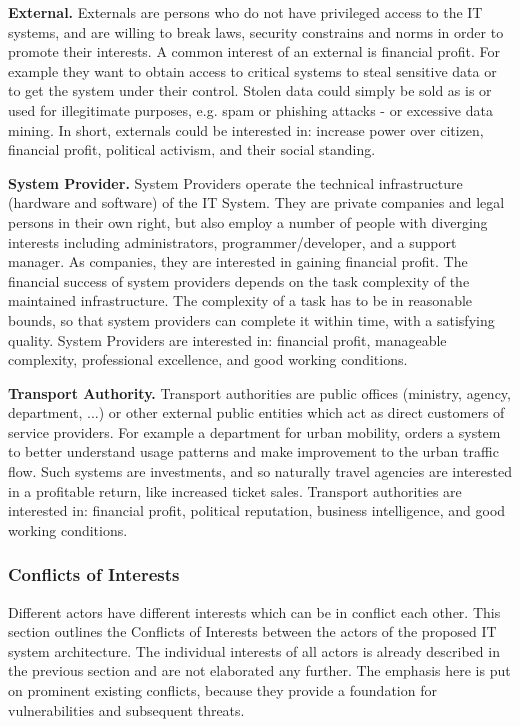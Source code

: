 \documentclass[runningheads,a4paper]{llncs}
\begin{document}
\textbf{External.}
Externals are persons who do not have privileged access to the IT systems, and are willing to break laws, security constrains and norms in order to promote their interests. A common interest of an external is financial profit. For example they want to obtain access to critical systems to steal sensitive data or to get the system under their control. Stolen data could simply be sold as is or used for illegitimate purposes, e.g. spam or phishing attacks - or excessive data mining. In short, externals could be interested in: increase power over citizen, financial profit, political activism, and their social standing.

\textbf{System Provider.}
System Providers operate the technical infrastructure (hardware and software) of the IT System. They are private companies and legal persons in their own right, but also employ a number of people with diverging interests including administrators, programmer/developer, and a support manager. As companies, they are interested in gaining financial profit. The financial success of system providers depends on the task complexity of the maintained infrastructure. The complexity of a task has to be in reasonable bounds, so that system providers can complete it within time, with a satisfying quality. System Providers are interested in: financial profit, manageable complexity, professional excellence, and good working conditions.

\textbf{Transport Authority.}
 Transport authorities are public offices (ministry, agency, department, ...) or other external public entities which act as direct customers of service providers. For example a department for urban mobility, orders a system to better understand usage patterns and make improvement to the urban traffic flow. Such systems are investments, and so naturally travel agencies are interested in a profitable return, like increased ticket sales. Transport authorities are interested in: financial profit, political reputation, business intelligence, and good working conditions.


\subsubsection{Conflicts of Interests}
\label{subsubsection:Conflicts of Interests}
Different actors have different interests which can be in conflict each other. This section outlines the Conflicts of Interests between the actors of the proposed IT system architecture. The individual interests of all actors is already described in the previous section and are not elaborated any further. The emphasis here is put on prominent existing conflicts, because they provide a foundation for vulnerabilities and subsequent threats.
\end{document}
